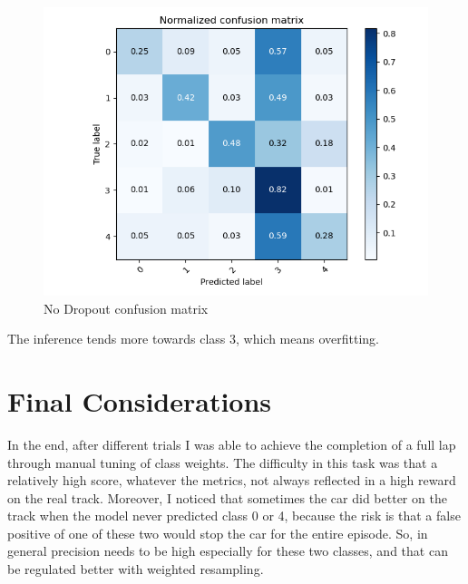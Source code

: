 \documentclass[12pt,a4paper,oneside]{article}
\begin{document}
\begin{figure}[H]
    \includegraphics{figures/no_dropout_confusion.png}
    \caption{No Dropout confusion matrix}
\end{figure}

The inference tends more towards class 3, which means overfitting.


\newpage


\section{Final Considerations}

In the end, after different trials I was able to achieve the completion of a
full lap through manual tuning of class weights. The difficulty in this task was
that a relatively high score, whatever the metrics, not always reflected in a
high reward on the real track. Moreover, I noticed that sometimes the car did
better on the track when the model never predicted class 0 or 4, because the
risk is that a false positive of one of these two would stop the car for the
entire episode. So, in general precision needs to be high especially for these
two classes, and that can be regulated better with weighted resampling. 



\nocite{*}  %
\end{document}
